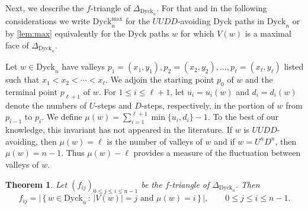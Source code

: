 \documentclass[11pt]{amsart}
\def\Dyck{\mathrm{Dyck}}
\theoremstyle{plain}
\numberwithin{lemma}{\DefaultNumberTheoremWithin}
\newtheorem{theorem}{Theorem}
\numberwithin{theorem}{\DefaultNumberTheoremWithin}
\numberwithin{corollary}{\DefaultNumberTheoremWithin}
\numberwithin{proposition}{\DefaultNumberTheoremWithin}
\numberwithin{conjecture}{\DefaultNumberTheoremWithin}
\theoremstyle{definition}
\numberwithin{definition}{\DefaultNumberTheoremWithin}
\numberwithin{question}{\DefaultNumberTheoremWithin}
\numberwithin{problem}{\DefaultNumberTheoremWithin}
\theoremstyle{remark}
\numberwithin{remark}{\DefaultNumberTheoremWithin}
\numberwithin{example}{\DefaultNumberTheoremWithin}
\numberwithin{claim}{\DefaultNumberTheoremWithin}
\begin{document}
Next, we describe the $f$-triangle of $\Delta_{\Dyck_n}$. For that 
and in 
the following considerations we write $\Dyck^ {\max}_n$ for the $UUDD$-avoiding Dyck paths in
$\Dyck_n$ or by \ref{lem:max} equivalently for the Dyck paths $w$ for which $V(w)$ is a maximal face of
$\Delta_{\Dyck_n}$. 


Let $w\in\Dyck_n$ have valleys
$p_1 = (x_1,y_1),p_2=(x_2,y_2),\ldots,p_\ell=(x_\ell,y_\ell)$ listed such that
$x_1 < x_2 < \cdots < x_\ell$. 
We adjoin the starting point $p_0$ of $w$ and the terminal
point $p_{\ell+1}$ of $w$.
For $1\leq i\leq \ell+1$, let $u_i = u_i(w)$ and $d_i= d_i(w)$
denote the numbers of $U$-steps and $D$-steps, respectively, in
the portion of $w$ from $p_{i-1}$ to $p_i$.
We define 
$\mu(w)=\sum_{i=1}^{\ell+1}\min\bigl\{u_i,d_i\bigr\}-1$.
To the best of our knowledge, this invariant has not appeared in the literature. If $w$ is $UUDD$-avoiding, then $\mu(w) = \ell$ is the number of
valleys of $w$ and if $w = U^nD^n$, then $\mu(w) = n-1$. Thus $\mu(w) - \ell$ provides a measure of the fluctuation between valleys of $w$.

\begin{theorem}\label{thm:typeA-f}
 Let $(f_{ij})_{0 \leq j \leq i \leq n-1}$ be the $f$-triangle of 
    $\Delta_{\Dyck_n}$. Then 
\[
f_{ij}
=\Big|\,\bigl\{\,
w\in\Dyck_n
\,:\,
|V(w)|=j\text{ and }\mu(w)=i
\,\bigr\}\,\Big|,
\qquad
0\leq j\leq i\leq n-1.
\]
\end{theorem}
\end{document}
